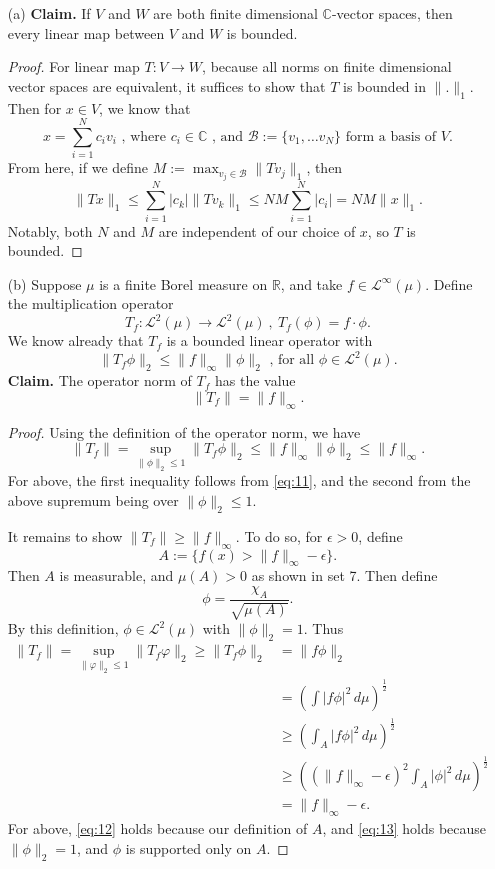 \documentclass[12pt]{article}
\newcommand{\R}{\mathbb{R}}
\newcommand{\C}{\mathbb{C}}
\newcommand{\eq}[1]{\begin{equation*}#1\end{equation*}}
\newcommand{\qeq}[1]{\begin{equation}#1\end{equation}}
\newcommand{\qal}[1]{\begin{align}#1\end{align}}
\begin{document}
\begin{itemize}
    \item [(a)] \textbf{Claim. } If $V$ and $W$ are both finite dimensional $\C$-vector spaces, then every linear map between $V$ and $W$ is bounded.
    
    \begin{proof}
        For linear map $T : V \to W$, because all norms on finite dimensional vector spaces are equivalent, it suffices to show that $T$ is bounded in $\|.\|_1$. Then for $x \in V$, we know that
        \eq{x = \sum_{i=1}^{N} c_i v_i \text{ , where } c_i \in \C \text{ , and } \mathcal{B} := \{v_1, \dots v_N\} \text{ form a basis of } V.}
        From here, if we define $M := \max_{v_j \in \mathcal{B}} \|Tv_j\|_1$, then
        \eq{\|Tx\|_1 \leq \sum_{i=1}^{N}|c_k| \|Tv_k\|_1 \leq N M \sum_{i=1}^{N} |c_i| = N M \|x\|_1.}
        Notably, both $N$ and $M$ are independent of our choice of $x$, so $T$ is bounded.
    \end{proof}

    \item [(b)] Suppose $\mu$ is a finite Borel measure on $\R$, and take $f \in \mathcal{L}^\infty (\mu)$. Define the multiplication operator
    \eq{T_f : \mathcal{L}^2(\mu) \to \mathcal{L}^2 (\mu) ~,~ T_f(\phi) = f \cdot \phi.}
    We know already that $T_f$ is a bounded linear operator with
    \qeq{\|T_f\phi\|_2 \leq \|f\|_\infty \|\phi\|_2 \text{ , for all } \phi \in \mathcal{L}^2 (\mu). \label{eq:11}}
    \textbf{Claim. } The operator norm of $T_f$ has the value 
    \eq{\|T_f\| = \|f\|_\infty.}

    \begin{proof}
        Using the definition of the operator norm, we have 
        \eq{\|T_f\| = \sup_{\|\phi\|_2 \leq 1} \|T_f\phi\|_2 \leq \|f\|_\infty \|\phi\|_2 \leq \|f\|_\infty.}
        For above, the first inequality follows from \eqref{eq:11}, and the second from the above supremum being over $\|\phi\|_2 \leq 1$.

        It remains to show $\|T_f\| \geq \|f\|_\infty$. To do so, for $\epsilon > 0$, define
        \eq{A := \{f(x) > \|f\|_\infty - \epsilon\}.} Then $A$ is measurable, and $\mu(A) > 0$ as shown in set 7. Then define 
        \eq{\phi = \frac{\chi_A}{\sqrt{\mu(A)}}.} By this definition, $\phi \in \mathcal{L}^2 (\mu)$ with $\|\phi\|_2 = 1$. Thus
        \qal{\|T_f\| = \sup_{\|\varphi\|_2 \leq 1} \|T_f \varphi\|_2 \geq \|T_f\phi\|_2 &= \|f \phi \|_2 \nonumber \\
            &= \left(\int |f\phi|^2\,d\mu\right)^\frac{1}{2} \nonumber \\
            &\geq \left(\int_A |f\phi|^2\,d\mu\right)^\frac{1}{2} \nonumber \\
            &\geq \left( (\|f\|_\infty - \epsilon)^2 \int_A |\phi|^2\,d\mu\right)^\frac{1}{2} \label{eq:12} \\
            &= \|f\|_\infty - \epsilon. \label{eq:13}}
            For above, \eqref{eq:12} holds because our definition of $A$, and \eqref{eq:13} holds because $\|\phi\|_2 = 1$, and $\phi$ is supported only on $A$.


\end{proof}
\end{itemize}
\end{document}

